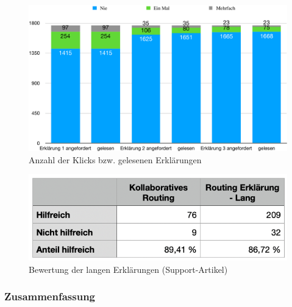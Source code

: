 \begin{figure}
    \includegraphics[width=\linewidth]{contents/06_model_evaluation/res/explanation_results_clicked.pdf}
    \caption{Anzahl der Klicks bzw. gelesenen Erklärungen}
    \label{fig:explanation_results_clicked}
\end{figure}

\begin{figure}
    \includegraphics[width=\linewidth]{contents/06_model_evaluation/res/explanation_results_clicked_support.png}
    \caption{Bewertung der langen Erklärungen (Support-Artikel)}
    \label{tab:explanation_results_clicked}
\end{figure}

\subsubsection{Zusammenfassung}

